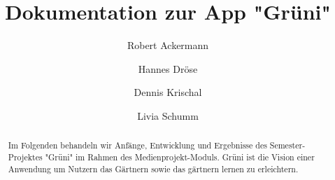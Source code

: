 \documentclass[sigchi, screen, nonacm]{acmart}
\begin{document}
\title{Dokumentation zur App "Grüni"}


\author{Robert Ackermann}

\author{Hannes Dröse}

\author{Dennis Krischal}

\author{Livia Schumm}


\begin{abstract}
Im Folgenden behandeln wir Anfänge, Entwicklung und Ergebnisse des Semester-Projektes "Grüni" im Rahmen des Medienprojekt-Moduls. Grüni ist die Vision einer Anwendung um Nutzern das Gärtnern sowie das gärtnern lernen zu erleichtern.
\end{abstract}


\maketitle



\appendix
\end{document}
